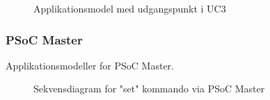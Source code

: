 \begin{figure}[H] \centering
    \caption{Applikationsmodel med udgangspunkt i UC3}
    \label{fig:uc3App}
\end{figure}


\subsubsection{PSoC Master}

Applikationsmodeller for PSoC Master.

\begin{figure}[H] \centering
    \caption{Sekvensdiagram for "set" kommando via PSoC Master}
    \label{fig:sekvensdiagram_psoc_master_set}
\end{figure}

